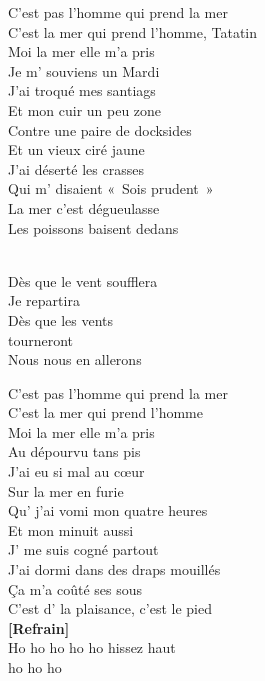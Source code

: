 \documentclass{novel}
\begin{document}
\begin{multicols}{3}

C'est pas l'homme qui prend la mer \\
C'est la mer qui prend l'homme, Tatatin \\
Moi la mer elle m'a pris \\
Je m' souviens un Mardi \\
J'ai troqué mes santiags \\
Et mon cuir un peu zone \\
Contre une paire de docksides \\
Et un vieux ciré jaune \\
J'ai déserté les crasses \\
Qui m' disaient «~Sois prudent~» \\
La mer c'est dégueulasse \\
Les poissons baisent dedans \\

\begin{bfseries}
[Refrain:]\\
Dès que le vent soufflera \\
Je repartira \\
Dès que les vents \\
tourneront \\
Nous nous en allerons \\
\end{bfseries}

C'est pas l'homme qui prend la mer \\
C'est la mer qui prend l'homme \\
Moi la mer elle m'a pris \\
Au dépourvu tans pis \\
J'ai eu si mal au cœur \\
Sur la mer en furie \\
Qu' j'ai vomi mon quatre heures \\
Et mon minuit aussi \\
J' me suis cogné partout \\
J'ai dormi dans des draps mouillés \\
Ça m'a coûté ses sous \\
C'est d' la plaisance, c'est le pied \\

\textbf{[Refrain]} \\

Ho ho ho ho ho hissez haut \\
ho ho ho \\


\end{multicols}
\end{document}
